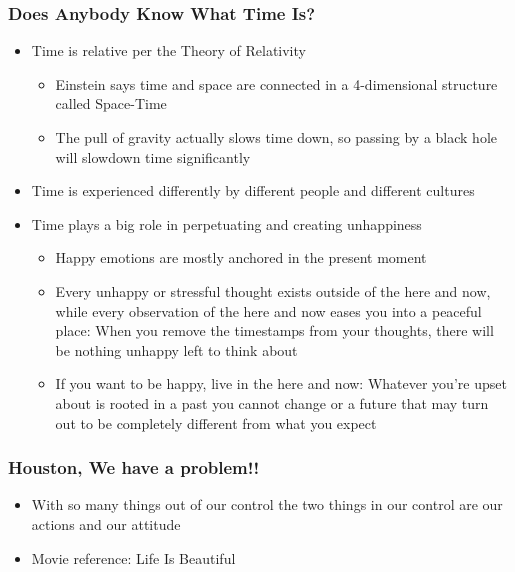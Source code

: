 \begin{frame}[fragile]\frametitle{Does Anybody Know What Time Is?}


\begin{itemize}
\item Time is relative per the Theory of Relativity
	\begin{itemize}
	\item Einstein says time and space are connected in a 4-dimensional structure called Space-Time
	\item The pull of gravity actually slows time down, so passing by a black hole will slowdown time significantly
	\end{itemize}

\item Time is experienced differently by different people and different cultures
\item Time plays a big role in perpetuating and creating unhappiness
	\begin{itemize}
	\item Happy emotions are mostly anchored in the present moment
	\item Every unhappy or stressful thought exists outside of the here and now, while every observation of the here and now eases you into a peaceful place: When you remove the timestamps from your thoughts, there will be nothing unhappy left to think about
	\item If you want to be happy, live in the here and now: Whatever you’re upset about is rooted in a past you cannot change or a future that may turn out to be completely different from what you expect
	\end{itemize}
\end{itemize}
\end{frame}

\begin{frame}[fragile]\frametitle{Houston, We have a problem!!}
\begin{itemize}
\item With so many things out of our control the two things in our control are our actions and our attitude
\item Movie reference: Life Is Beautiful
\end{itemize}
\end{frame}

